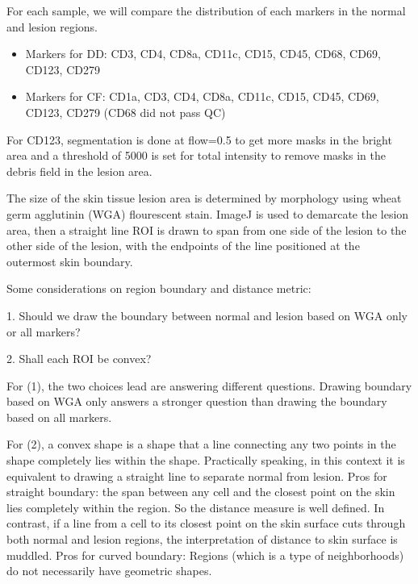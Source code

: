 \documentclass{article}
\begin{document}
\bigskip

For each sample, we will compare the distribution of each markers in the
normal and lesion regions.

\begin{itemize}
\item Markers for DD: CD3, CD4, CD8a, CD11c, CD15, CD45, CD68, CD69, CD123,
CD279

\item Markers for CF: CD1a, CD3, CD4, CD8a, CD11c, CD15, CD45, CD69, CD123,
CD279 (CD68 did not pass QC)
\end{itemize}

For CD123, segmentation is done at flow=0.5 to get more masks in the bright
area and a threshold of 5000 is set for total intensity to remove masks in
the debris field in the lesion area.

\bigskip

The size of the skin tissue lesion area is determined by morphology using
wheat germ agglutinin (WGA) flourescent stain. ImageJ is used to demarcate
the lesion area, then a straight line ROI is drawn to span from one side of
the lesion to the other side of the lesion, with the endpoints of the line
positioned at the outermost skin boundary. \ \ \ \ 

\bigskip

Some considerations on region boundary and distance metric: \ 

1. Should we draw the boundary between normal and lesion based on WGA only
or all markers?

2. Shall each ROI be convex?

For (1), the two choices lead are answering different questions. Drawing
boundary based on WGA only answers a stronger question than drawing the
boundary based on all markers.

For (2), a convex shape is a shape that a line connecting any two points in
the shape completely lies within the shape. Practically speaking, in this
context it is equivalent to drawing a straight line to separate normal from
lesion. Pros for straight boundary: the span between any cell and the
closest point on the skin lies completely within the region. So the distance
measure is well defined. In contrast, if a line from a cell to its closest
point on the skin surface cuts through both normal and lesion regions, the
interpretation of distance to skin surface is muddled. Pros for curved
boundary: Regions (which is a type of neighborhoods) do not necessarily have
geometric shapes.
\end{document}
